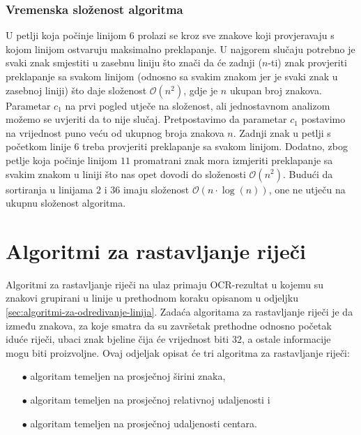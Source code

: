 \documentclass[times, utf8, zavrsni]{fer}
\begin{document}
\subsubsection{Vremenska složenost algoritma}
U petlji koja počinje linijom $6$ prolazi se kroz sve znakove koji provjeravaju
s kojom linijom ostvaruju maksimalno preklapanje. U najgorem slučaju potrebno je
svaki znak smjestiti u zasebnu liniju što znači da će zadnji ($n$-ti) znak
provjeriti preklapanje sa svakom linijom (odnosno sa svakim znakom jer je svaki
znak u zasebnoj liniji) što daje složenost $\mathcal{O}(n^2)$, gdje je $n$
ukupan broj znakova. Parametar $c_1$ na prvi pogled utječe na složenost, ali
jednostavnom analizom možemo se uvjeriti da to nije slučaj. Pretpostavimo da
parametar $c_1$ postavimo na vrijednost puno veću od ukupnog broja znakova $n$.
Zadnji znak u petlji s početkom linije $6$ treba provjeriti preklapanje sa
svakom linijom. Dodatno, zbog petlje koja počinje linijom $11$ promatrani znak
mora izmjeriti preklapanje sa svakim znakom u liniji što nas opet dovodi do
složenosti $\mathcal{O}(n^2)$. Budući da sortiranja u linijama $2$ i $36$ imaju
složenost $\mathcal{O}(n \cdot \log(n))$, one ne utječu na ukupnu složenost
algoritma.








\section{Algoritmi za rastavljanje riječi}
\label{sec:algoritmi-za-rastavljanje-riječi}
Algoritmi za rastavljanje riječi na ulaz primaju OCR-rezultat u kojemu su
znakovi grupirani u linije u prethodnom koraku opisanom u odjeljku
\ref{sec:algoritmi-za-odredivanje-linija}. Zadaća algoritama za rastavljanje
riječi je da između znakova, za koje smatra da su završetak prethodne odnosno
početak iduće riječi, ubaci znak bjeline čija će vrijednost  biti
$32$, a ostale informacije mogu biti proizvoljne.
Ovaj odjeljak opisat će tri algoritma za rastavljanje riječi:
\begin{itemize}
    \item[$\bullet$] algoritam temeljen na prosječnoj širini znaka,
    \item[$\bullet$] algoritam temeljen na prosječnoj relativnoj
                     udaljenosti i
    \item[$\bullet$] algoritam temeljen na prosječnoj udaljenosti centara.
\end{itemize}
\end{document}
